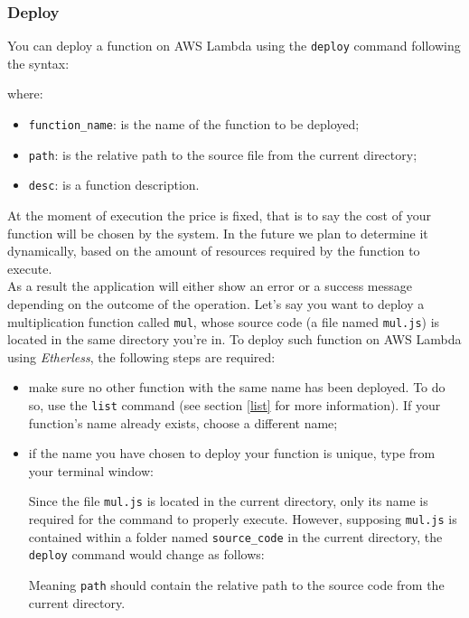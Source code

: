 \subsubsection{Deploy}\label{deploy}
You can deploy a function on AWS Lambda using the \texttt{deploy} command following the syntax:
\begin{center}
\end{center}
\noindent where:
\begin{itemize}
	\item \texttt{function\_name}: is the name of the function to be deployed;
	\item \texttt{path}: is the relative path to the source file from the current directory;
	\item \texttt{desc}: is a function description.
\end{itemize}
At the moment of execution the price is fixed, that is to say the cost of your function will be chosen by the system. In the future we plan to determine it dynamically, based on the amount of resources required by the function to execute. \\
As a result the application will either show an error or a success message depending on the outcome of the operation.
Let's say you want to deploy a multiplication function called \texttt{mul}, whose source code (a file named \texttt{mul.js}) is located in the same directory you're in. To deploy such function on AWS Lambda using \textit{Etherless}, the following steps are required:
\begin{itemize}
\item make sure no other function with the same name has been deployed. To do so, use the \texttt{list} command (see section \ref{list} for more information). If your function's name already exists, choose a different name;
\item if the name you have chosen to deploy your function is unique, type from your terminal window:
\begin{center}
\end{center}
Since the file \texttt{mul.js} is located in the current directory, only its name is required for the command to properly execute. However, supposing \texttt{mul.js} is contained within a folder named \texttt{source\_code} in the current directory, the \texttt{deploy} command would change as follows:
\begin{center}
\end{center}
Meaning \texttt{path} should contain the relative path to the source code from the current directory.
\end{itemize}


